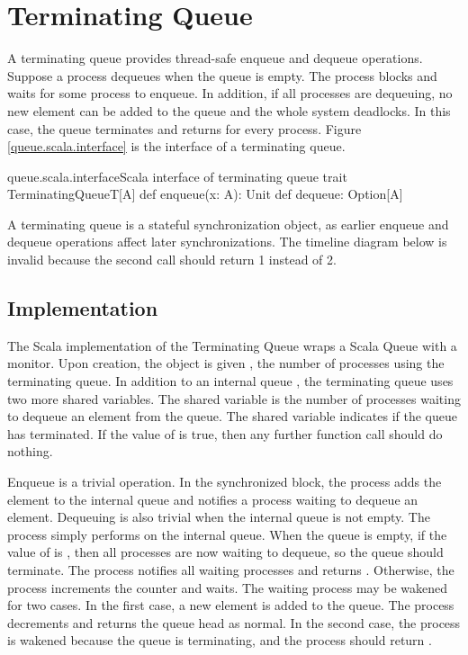 \documentclass[a4paper, 12pt]{article}
\begin{document}
\newpage
\section{Terminating Queue}
A terminating queue provides thread-safe enqueue and dequeue operations. Suppose a process dequeues when the queue is empty. The process blocks and waits for some process to enqueue. In addition, if all processes are dequeuing, no new element can be added to the queue and the whole system deadlocks. In this case, the queue terminates and returns  for every process. Figure \ref{queue.scala.interface} is the interface of a terminating queue.

\begin{scalafloat}{queue.scala.interface}{Scala interface of terminating queue}
trait TerminatingQueueT[A]{ 
  def enqueue(x: A): Unit
  def dequeue: Option[A] 
}
\end{scalafloat}

A terminating queue is a stateful synchronization object, as earlier enqueue and dequeue operations affect later synchronizations. The timeline diagram below is invalid because the second  call should return 1 instead of 2. 


\subsection{Implementation}
The Scala implementation of the Terminating Queue wraps a Scala Queue with a monitor. Upon creation, the object is given , the number of processes using the terminating queue. In addition to an internal queue , the terminating queue uses two more shared variables. The shared variable  is the number of processes waiting to dequeue an element from the queue. The shared variable  indicates if the queue has terminated. If the value of  is true, then any further function call should do nothing.

Enqueue is a trivial operation. In the synchronized block, the process adds the element to the internal queue and notifies a process waiting to dequeue an element. Dequeuing is also trivial when the internal queue is not empty. The process simply performs  on the internal queue. When the queue is empty, if the value of  is , then all processes are now waiting to dequeue, so the queue should terminate. The process notifies all waiting processes and returns . Otherwise, the process increments the counter  and waits. The waiting process may be wakened for two cases. In the first case, a new element is added to the queue. The process decrements  and returns the queue head as normal. In the second case, the process is wakened because the queue is terminating, and the process should return . 
\end{document}
